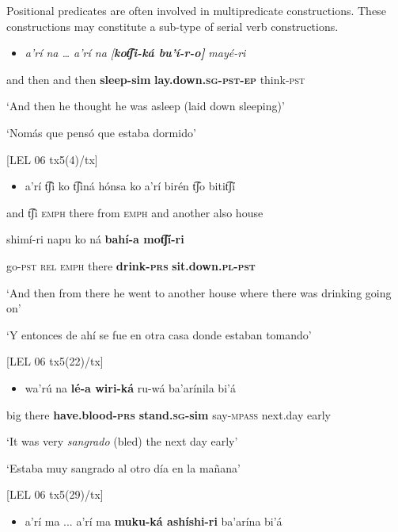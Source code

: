 Positional predicates are often involved in multipredicate constructions. These constructions may constitute a sub-type of serial verb constructions.

\begin{itemize}
\item \textit{a’rí   na …   a’rí   na      [}\textbf{\textit{kot͡ʃi-ká    bu’í-r-o]}} \textit{mayé-ri}
\end{itemize}

  and   then   and   then   \textbf{sleep-sim }\textbf{lay.down.\textsc{sg}}\textbf{{}-}\textbf{\textsc{pst-ep}} think-\textsc{pst}

  ‘And then he thought he was asleep (laid down sleeping)’

  ‘Nomás que pensó que estaba dormido’

  [LEL 06 tx5(4)/tx]

\begin{itemize}
\item a’rí   t͡ʃi   ko        t͡ʃiná  hónsa  ko       a’rí    birén      t͡ʃo   bitit͡ʃí   
\end{itemize}

  and   t͡ʃi   \textsc{emph} there    from  \textsc{emph} and    another    also   house   

shimí-ri  napu   ko   ná   \textbf{bahí-a     mot͡ʃí-ri} 

go-\textsc{pst    rel}   \textsc{emph} there   \textbf{drink-\textsc{prs} }\textbf{sit.down.\textsc{pl}}\textbf{{}-}\textbf{\textsc{pst}}

  ‘And then from there he went to another house where there was drinking going on’  

  ‘Y entonces de ahí se fue en otra casa donde estaban tomando’

  [LEL 06 tx5(22)/tx]

\begin{itemize}
\item wa’rú   na   \textbf{lé-a       wiri-ká} ru-wá     ba’arínila   bi’á
\end{itemize}

  big        there   \textbf{have.blood-\textsc{prs}} \textbf{stand.\textsc{sg}}\textbf{{}-sim} say-\textsc{mpass}  next.day  early

‘It was very \textit{sangrado} (bled) the next day early’

‘Estaba muy sangrado al otro día en la mañana’  

[LEL 06 tx5(29)/tx]

\begin{itemize}
\item a’rí   ma ...  a’rí   ma   \textbf{muku-ká     ashíshi-ri}   ba’arína  bi’á
\end{itemize}

